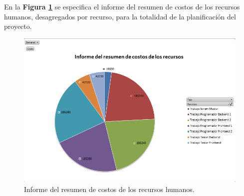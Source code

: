 En la \textbf{Figura \ref{resumen-costos}} se especifica el informe del resumen de costos de los recursos humanos, desagregados por recurso, para la totalidad de la planificación del proyecto.

\begin{figure}[h]
    \centering
    \includegraphics[width=\textwidth]{img/tp2_capitulo3/resumen-costos}
    \caption{Informe del resumen de costos de los recursos humanos.}
    \label{resumen-costos}
\end{figure}

